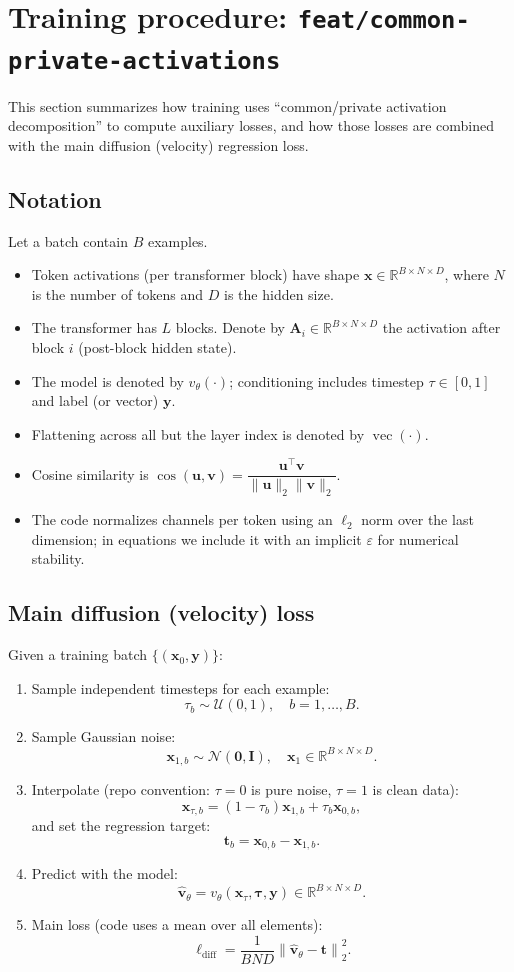 \documentclass[11pt]{article}
\newcommand{\vecv}{\operatorname{vec}}
\begin{document}
\section*{Training procedure: \texttt{feat/common-private-activations}}

This section summarizes how training uses ``common/private activation decomposition'' to compute auxiliary losses, and how those losses are combined with the main diffusion (velocity) regression loss.

\subsection*{Notation}
Let a batch contain $B$ examples.
\begin{itemize}
  \item Token activations (per transformer block) have shape $\bm{x}\in \mathbb{R}^{B\times N\times D}$, where $N$ is the number of tokens and $D$ is the hidden size.
  \item The transformer has $L$ blocks. Denote by $\bm{A}_i\in\mathbb{R}^{B\times N\times D}$ the activation after block $i$ (post-block hidden state).
  \item The model is denoted by $v_\theta(\cdot)$; conditioning includes timestep $\tau\in[0,1]$ and label (or vector) $\bm{y}$.
  \item Flattening across all but the layer index is denoted by $\vecv(\cdot)$.
  \item Cosine similarity is $\cos(\bm{u},\bm{v})=\dfrac{\bm{u}^\top \bm{v}}{\|\bm{u}\|_2\|\bm{v}\|_2}$.
  \item The code normalizes channels per token using an $\ell_2$ norm over the last dimension; in equations we include it with an implicit $\varepsilon$ for numerical stability.
\end{itemize}

\subsection*{Main diffusion (velocity) loss}
Given a training batch $\{(\bm{x}_0,\bm{y})\}$:
\begin{enumerate}
  \item Sample independent timesteps for each example:
  \[
    \tau_b \sim \mathcal{U}(0,1),\quad b=1,\dots,B.
  \]
  \item Sample Gaussian noise:
  \[
    \bm{x}_{1,b}\sim \mathcal{N}(\bm{0},\bm{I}),\quad \bm{x}_{1}\in\mathbb{R}^{B\times N\times D}.
  \]
  \item Interpolate (repo convention: $\tau=0$ is pure noise, $\tau=1$ is clean data):
  \[
    \bm{x}_{\tau,b}=(1-\tau_b)\bm{x}_{1,b}+\tau_b \bm{x}_{0,b},
  \]
  and set the regression target:
  \[
    \bm{t}_b=\bm{x}_{0,b}-\bm{x}_{1,b}.
  \]
  \item Predict with the model:
  \[
    \hat{\bm{v}}_\theta = v_\theta(\bm{x}_\tau,\bm{\tau},\bm{y}) \in \mathbb{R}^{B\times N\times D}.
  \]
  \item Main loss (code uses a mean over all elements):
  \[
    \ell_{\text{diff}} = \frac{1}{BND}\left\|\hat{\bm{v}}_\theta - \bm{t}\right\|_2^2.
  \]
\end{enumerate}
\end{document}
